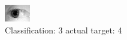 \begin{figure}[h!]
\begin{center}
\includegraphics[width=0.60\columnwidth]{figures/ID1236_class_3_target_4.png}
\end{center}
\caption{ Classification: 3 actual target: 4}
\label{fig:ID1236_class_3_target_4}
\end{figure}
